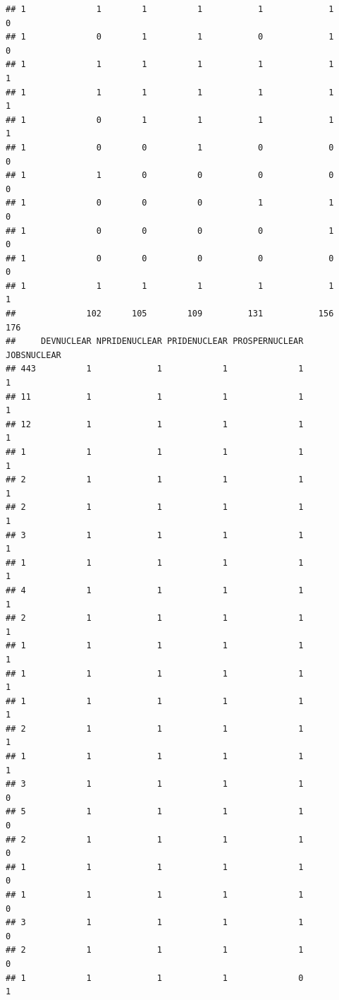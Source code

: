 \documentclass[
]{article}
\begin{document}
\begin{verbatim}
## 1              1        1          1           1             1          0
## 1              0        1          1           0             1          0
## 1              1        1          1           1             1          1
## 1              1        1          1           1             1          1
## 1              0        1          1           1             1          1
## 1              0        0          1           0             0          0
## 1              1        0          0           0             0          0
## 1              0        0          0           1             1          0
## 1              0        0          0           0             1          0
## 1              0        0          0           0             0          0
## 1              1        1          1           1             1          1
##              102      105        109         131           156        176
##     DEVNUCLEAR NPRIDENUCLEAR PRIDENUCLEAR PROSPERNUCLEAR JOBSNUCLEAR
## 443          1             1            1              1           1
## 11           1             1            1              1           1
## 12           1             1            1              1           1
## 1            1             1            1              1           1
## 2            1             1            1              1           1
## 2            1             1            1              1           1
## 3            1             1            1              1           1
## 1            1             1            1              1           1
## 4            1             1            1              1           1
## 2            1             1            1              1           1
## 1            1             1            1              1           1
## 1            1             1            1              1           1
## 1            1             1            1              1           1
## 2            1             1            1              1           1
## 1            1             1            1              1           1
## 3            1             1            1              1           0
## 5            1             1            1              1           0
## 2            1             1            1              1           0
## 1            1             1            1              1           0
## 1            1             1            1              1           0
## 3            1             1            1              1           0
## 2            1             1            1              1           0
## 1            1             1            1              0           1

\end{verbatim}
\end{document}
